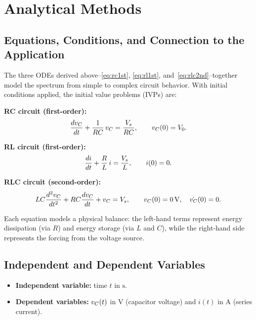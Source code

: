 \section{Analytical Methods}
\label{sec:methods}

\subsection{Equations, Conditions, and Connection to the Application}

The three ODEs derived above--\eqref{eq:rc1st}, \eqref{eq:rl1st},
and~\eqref{eq:rlc2nd}--together model the spectrum from simple to complex
circuit behavior.
With initial conditions applied, the initial value problems (IVPs) are:

\noindent\textbf{RC circuit (first-order):}
\begin{equation}
  \frac{dv_C}{dt} + \frac{1}{RC}\,v_C = \frac{V_s}{RC}, \qquad v_C(0) = V_0.
  \label{eq:rc_ivp}
\end{equation}

\noindent\textbf{RL circuit (first-order):}
\begin{equation}
  \frac{di}{dt} + \frac{R}{L}\,i = \frac{V_s}{L}, \qquad i(0) = 0.
  \label{eq:rl_ivp}
\end{equation}

\noindent\textbf{RLC circuit (second-order):}
\begin{equation}
  LC\frac{d^2v_C}{dt^2} + RC\frac{dv_C}{dt} + v_C = V_s,
  \qquad v_C(0) = 0\,\mathrm{V},\quad \dot{v_C}(0) = 0.
  \label{eq:rlc_ivp}
\end{equation}

Each equation models a physical balance: the left-hand terms represent
energy dissipation (via $R$) and energy storage (via $L$ and $C$), while
the right-hand side represents the forcing from the voltage source.

\subsection{Independent and Dependent Variables}

\begin{itemize}
  \item \textbf{Independent variable:} time $t$ in $\mathrm{s}$.
  \item \textbf{Dependent variables:} $v_C(t)$ in $\mathrm{V}$ (capacitor
        voltage) and $i(t)$ in $\mathrm{A}$ (series current).
\end{itemize}

